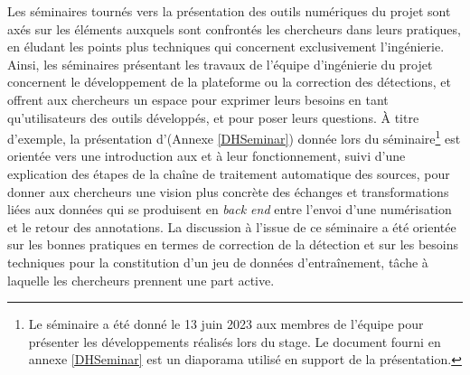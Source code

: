     Les séminaires tournés vers la présentation des outils numériques du projet sont axés sur les éléments auxquels sont confrontés les chercheurs dans leurs pratiques, en éludant les points plus techniques qui concernent exclusivement l'ingénierie. Ainsi, les séminaires présentant les travaux de l'équipe d'ingénierie du projet \eida concernent le développement de la plateforme ou la correction des détections, et offrent aux chercheurs un espace pour exprimer leurs besoins en tant qu'utilisateurs des outils développés, et pour poser leurs questions. À titre d'exemple, la présentation d'\exapi (Annexe \ref{DHSeminar}) donnée lors du séminaire\footnote{Le séminaire a été donné le 13 juin 2023 aux membres de l'équipe \eida pour présenter les développements réalisés lors du stage. Le document fourni en annexe \ref{DHSeminar} est un diaporama utilisé en support de la présentation.} est orientée vers une introduction aux \api et à leur fonctionnement, suivi d'une explication des étapes de la chaîne de traitement automatique des sources, pour donner aux chercheurs une vision plus concrète des échanges et transformations liées aux données qui se produisent en \textit{back end} entre l'envoi d'une numérisation et le retour des annotations. La discussion à l'issue de ce séminaire a été orientée sur les bonnes pratiques en termes de correction de la détection et sur les besoins techniques pour la constitution d'un jeu de données d'entraînement, tâche à laquelle les chercheurs prennent une part active.
	
